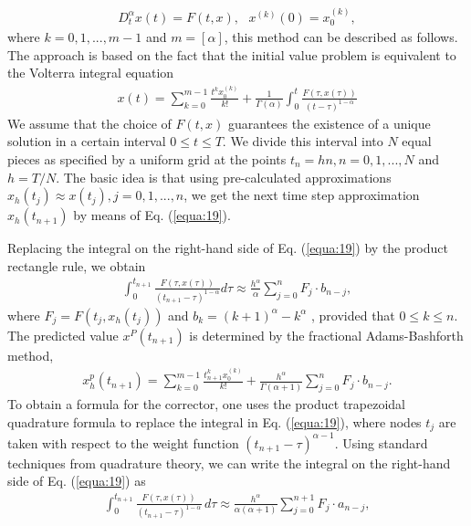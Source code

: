 \documentclass[10pt]{article}
\begin{document}
\begin{multicols}{2}
        \begin{align}
            D_t^\alpha x(t) = F(t,x), ~~~ x^{(k)}(0) = x_0^{(k)}, \label{equa:18}
        \end{align}
        where $k = 0, 1, . . . , m - 1$ and $m = [\alpha]$, this method can be described as follows. The approach is based on the fact that the initial value problem is equivalent to the Volterra integral equation
        \begin{align}
            x(t) = \sum_{k=0}^{m-1} \frac{t^k x_0^{(k)}}{k!} + \frac{1}{\Gamma (\alpha)} \int_0^t \frac{F(\tau , x(\tau))}{(t- \tau)^{1-\alpha}} \label{equa:19}
        \end{align}
        We assume that the choice of $F(t, x)$ guarantees the existence of a unique solution in a certain interval $0 \le t \le T$. We divide this interval into $N$ equal pieces as specified by a uniform grid at the points $t_n = hn, n = 0, 1, . . . , N$ and $h = T / N$. The basic idea is that using pre-calculated approximations $x_h(t_j ) \approx x(t_j ), j = 0, 1, . . . , n$, we get the next time step approximation $x_h(t_{n+1})$ by means of Eq. (\ref{equa:19}). \par
        Replacing the integral on the right-hand side of Eq. (\ref{equa:19}) by the product rectangle rule, we obtain
        \begin{align}
            \int_0^{t_{n+1}} \frac{F(\tau , x(\tau))}{(t_{n+1}-\tau)^{1-\alpha}}d\tau \approx \frac{h^\alpha}{\alpha} \sum_{j=0}^n F_j \cdot b_{n-j}, \label{equa:20}
        \end{align}
        where $F_j = F(t_j , x_h(t_j))$ and $b_k = (k + 1)^\alpha - k^\alpha$ , provided that $0 \le k \le n$. The predicted value $x^P (t_{n+1})$ is determined by the fractional Adams-Bashforth method,
        \begin{align}
            x_h^p (t_{n+1}) = \sum_{k=0}^{m-1} \frac{t_{n+1}^k x_0^{(k)}}{k!} + \frac{h^\alpha}{\Gamma (\alpha + 1)} \sum_{j=0}^n F_j \cdot b_{n-j}. \label{equa:21}
        \end{align}
        To obtain a formula for the corrector, one uses the product trapezoidal quadrature formula to replace the integral in Eq. (\ref{equa:19}), where nodes $t_j$ are taken with respect to the weight function $(t_{n+1} - \tau)^{\alpha - 1}$. Using standard techniques from quadrature theory, we can write the integral on the right-hand side of Eq. (\ref{equa:19}) as
        \begin{align}
            \int_0^{t_{n+1}} \frac{F(\tau,x(\tau))}{(t_{n+1}-\tau)^{1-\alpha}}\,d\tau \approx \frac{h^\alpha}{\alpha(\alpha + 1)} \sum_{j=0}^{n+1} F_j \cdot a_{n-j}, \label{equa:22}

\end{align}
\end{multicols}
\end{document}
